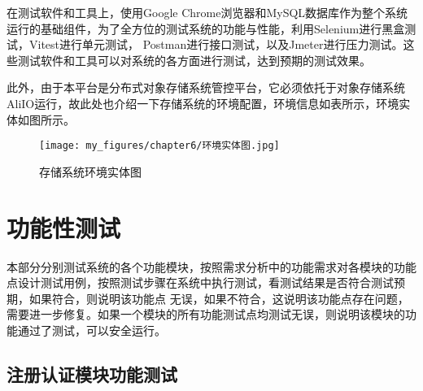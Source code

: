 在测试软件和工具上，使用Google Chrome浏览器和MySQL数据库作为整个系统运行的基础组件，为了全方位的测试系统的功能与性能，利用Selenium进行黑盒测试\cite{kng222eji}，Vitest进行单元测试\cite{kng2562eji}，
Postman进行接口测试，以及Jmeter进行压力测试\cite{kng232eji}。这些测试软件和工具可以对系统的各方面进行测试，达到预期的测试效果。

此外，由于本平台是分布式对象存储系统管控平台，它必须依托于对象存储系统AliIO运行，故此处也介绍一下存储系统的环境配置，环境信息如表所示，环境实体如图所示。

\begin{center}
    \renewcommand\arraystretch{1.5}{
    }
\end{center}


\begin{figure}[htb]
    \centering
    \texttt{[image: my\_figures/chapter6/环境实体图.jpg]}
    \caption{存储系统环境实体图}
    \label{fig:存储系统环境实体图}
\end{figure}


\section{功能性测试}

本部分分别测试系统的各个功能模块，按照需求分析中的功能需求对各模块的功能点设计测试用例，按照测试步骤在系统中执行测试，看测试结果是否符合测试预期，如果符合，则说明该功能点
无误，如果不符合，这说明该功能点存在问题，需要进一步修复。如果一个模块的所有功能测试点均测试无误，则说明该模块的功能通过了测试，可以安全运行。


\subsection{注册认证模块功能测试}

